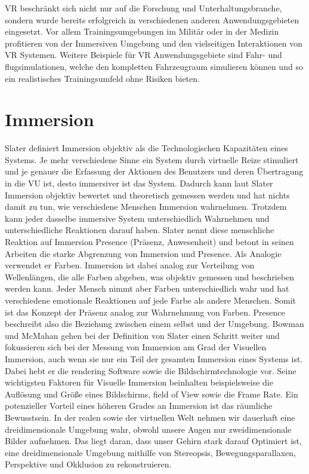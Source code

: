 VR beschränkt sich nicht nur auf die Forschung und Unterhaltungsbranche, sondern wurde bereits erfolgreich in verschiedenen anderen Anwendungsgebieten eingesetzt. Vor allem Trainingsumgebungen im Militär oder in der Medizin profitieren von der Immersiven Umgebung und den vielseitigen Interaktionen von VR Systemen. Weitere Beispiele für VR Anwendungsgebiete sind Fahr- und flugsimulationen, welche den kompletten Fahrzeugraum simulieren können und so ein realistisches Trainingsumfeld ohne Risiken bieten.\cite{Ragan2010}
 

\section{Immersion}
Slater\cite{Slater2003}\cite{Slater1999} definiert Immersion objektiv als die Technologischen Kapazitäten eines Systems. Je mehr verschiedene Sinne ein System durch virtuelle Reize stimuliert und je genauer die Erfassung der Aktionen des Benutzers und deren Übertragung in die VU ist, desto immersiver ist das System. Dadurch kann laut Slater Immersion objektiv bewertet und theoretisch gemessen werden und hat nichts damit zu tun, wie verschiedene Menschen Immersion wahrnehmen. Trotzdem kann jeder dasselbe immersive System unterschiedlich Wahrnehmen und unterschiedliche Reaktionen darauf haben. Slater nennt diese menschliche Reaktion auf Immersion Presence (Präsenz, Anwesenheit) und betont in seinen Arbeiten die starke Abgrenzung von Immersion und Presence. Als Analogie verwendet er Farben. Immersion ist dabei analog zur Verteilung von Wellenlängen, die alle Farben abgeben, was objektiv gemessen und beschrieben werden kann. Jeder Mensch nimmt aber Farben unterschiedlich wahr und hat verschiedene emotionale Reaktionen auf jede Farbe als andere Menschen. Somit ist das Konzept der Präsenz analog zur Wahrnehmung von Farben. Presence beschreibt also die Beziehung zwischen einem selbst und der Umgebung.
Bowman und McMahan\cite{Bowman2007} gehen bei der Definition von Slater einen Schritt weiter und fokussieren sich bei der Messung von Immersion am Grad der Visuellen Immersion, auch wenn sie nur ein Teil der gesamten Immersion eines Systems ist. Dabei hebt er die rendering Software sowie die Bildschirmtechnologie vor. Seine wichtigsten Faktoren für Visuelle Immersion beinhalten beispielsweise die Auflösung und Größe eines Bildschirms, field of View sowie die Frame Rate.
Ein potenzieller Vorteil eines höheren Grades an Immersion ist das räumliche Bewusstsein. In der realen sowie der virtuellen Welt nehmen wir dauerhaft eine dreidimensionale Umgebung wahr, obwohl unsere Augen nur zweidimensionale Bilder aufnehmen. Das liegt daran, dass unser Gehirn stark darauf Optimiert ist, eine dreidimensionale Umgebung mithilfe von Stereopsis, Bewegungsparallaxen, Perspektive und Okklusion zu rekonstruieren. 
